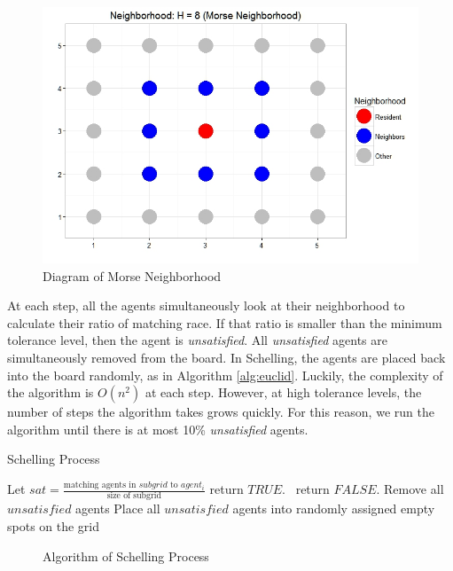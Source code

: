 \documentclass[11pt]{asaproc}
\newcommand{\1}{\mathbb{1}}
\begin{document}
\begin{figure}[h!]
\centering
\includegraphics[scale=.33]{figures/H8.jpeg}
\caption{Diagram of Morse Neighborhood}
\label{fig:morse}
\end{figure}

At each step, all the agents simultaneously look at their neighborhood to calculate their ratio of matching race. If that ratio is smaller than the minimum tolerance level, then the agent is \textit{unsatisfied}. All \textit{unsatisfied} agents are simultaneously removed from the board. In Schelling, the agents are placed back into the board randomly, as in Algorithm \ref{alg:euclid}. Luckily, the complexity of the algorithm is $O(n^2)$ at each step. However, at high tolerance levels, the number of steps the algorithm takes grows quickly. For this reason, we run the algorithm until there is at most 10\% \textit{unsatisfied} agents.

 \begin{algorithm}[h!]
  \caption{Schelling Process}\label{alg:euclid}
  \begin{algorithmic}[1]
        	\State Let $sat = \frac{\mbox{matching agents in $subgrid$ to $agent_i$}}{\mbox{size of subgrid}}$
       			\State return $TRUE$. 
                \Else \ return $FALSE$. 
    		\EndIf
        \EndProcedure
        	\State Remove all $unsatisfied$ agents
            \State Place all $unsatisfied$ agents into randomly assigned empty spots on the grid
        \EndWhile{}
  	\EndFunction{}
  \end{algorithmic}
  \end{algorithm}
  \begin{figure}[h!]
  \caption{Algorithm of Schelling Process}
\end{figure}
\end{document}
